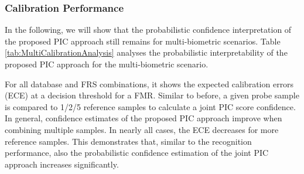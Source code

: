 \documentclass[10pt,twocolumn,letterpaper]{article}
\begin{document}
\vspace{-3mm}
\subsubsection{Calibration Performance}
\vspace{-2mm}


In the following, we will show that the probabilistic confidence interpretation of the proposed PIC approach still remains for multi-biometric scenarios.
Table \ref{tab:MultiCalibrationAnalysis} analyses the probabilistic interpretability of the proposed PIC approach for the multi-biometric scenario.

For all database and FRS combinations, it shows the expected calibration errors (ECE) at a decision threshold for a  FMR.
Similar to before, a given probe sample is compared to 1/2/5 reference samples to calculate a joint PIC score confidence.
In general, confidence estimates of the proposed PIC approach improve when combining multiple samples.
In nearly all cases, the ECE decreases for more reference samples.
This demonstrates that, similar to the recognition performance, also the probabilistic confidence estimation of the joint PIC approach increases significantly.
\end{document}
